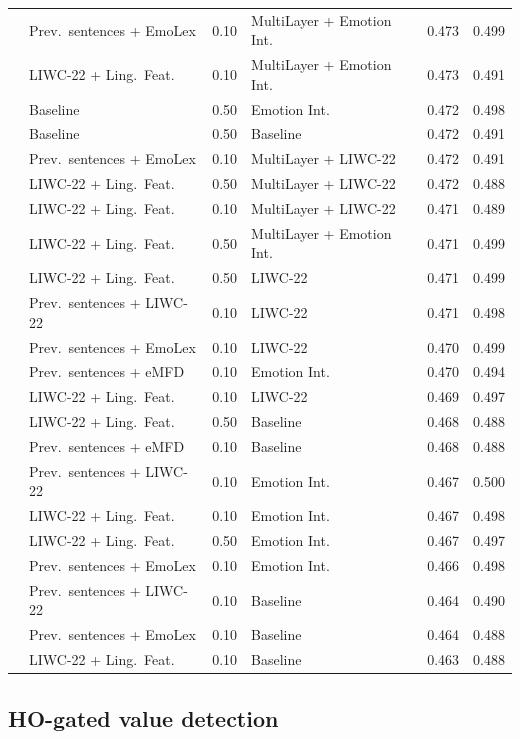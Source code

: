 {\begin{longtable}{llclcc}
 & Prev.\ sentences + EmoLex & 0.10 & MultiLayer + Emotion Int. & 0.473 & 0.499 \\
 & LIWC-22 + Ling.\ Feat. & 0.10 & MultiLayer + Emotion Int. & 0.473 & 0.491 \\
 & Baseline & 0.50 & Emotion Int. & 0.472 & 0.498 \\
 & Baseline & 0.50 & Baseline & 0.472 & 0.491 \\
 & Prev.\ sentences + EmoLex & 0.10 & MultiLayer + LIWC-22 & 0.472 & 0.491 \\
 & LIWC-22 + Ling.\ Feat. & 0.50 & MultiLayer + LIWC-22 & 0.472 & 0.488 \\
 & LIWC-22 + Ling.\ Feat. & 0.10 & MultiLayer + LIWC-22 & 0.471 & 0.489 \\
 & LIWC-22 + Ling.\ Feat. & 0.50 & MultiLayer + Emotion Int. & 0.471 & 0.499 \\
 & LIWC-22 + Ling.\ Feat. & 0.50 & LIWC-22 & 0.471 & 0.499 \\
 & Prev.\ sentences + LIWC-22 & 0.10 & LIWC-22 & 0.471 & 0.498 \\
 & Prev.\ sentences + EmoLex & 0.10 & LIWC-22 & 0.470 & 0.499 \\
 & Prev.\ sentences + eMFD & 0.10 & Emotion Int. & 0.470 & 0.494 \\
 & LIWC-22 + Ling.\ Feat. & 0.10 & LIWC-22 & 0.469 & 0.497 \\
 & LIWC-22 + Ling.\ Feat. & 0.50 & Baseline & 0.468 & 0.488 \\
 & Prev.\ sentences + eMFD & 0.10 & Baseline & 0.468 & 0.488 \\
 & Prev.\ sentences + LIWC-22 & 0.10 & Emotion Int. & 0.467 & 0.500 \\
 & LIWC-22 + Ling.\ Feat. & 0.10 & Emotion Int. & 0.467 & 0.498 \\
 & LIWC-22 + Ling.\ Feat. & 0.50 & Emotion Int. & 0.467 & 0.497 \\
 & Prev.\ sentences + EmoLex & 0.10 & Emotion Int. & 0.466 & 0.498 \\
 & Prev.\ sentences + LIWC-22 & 0.10 & Baseline & 0.464 & 0.490 \\
 & Prev.\ sentences + EmoLex & 0.10 & Baseline & 0.464 & 0.488 \\
 & LIWC-22 + Ling.\ Feat. & 0.10 & Baseline & 0.463 & 0.488 \\
\end{longtable}
}


\subsection{HO-gated value detection}
\label{sec:s8-values}

